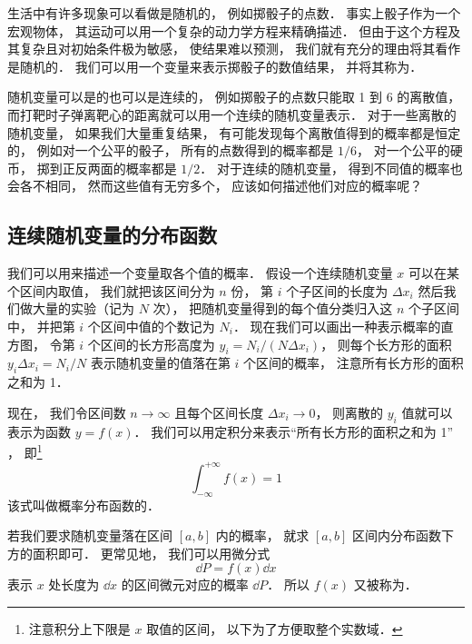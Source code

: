 

生活中有许多现象可以看做是随机的， 例如掷骰子的点数． 事实上骰子作为一个宏观物体， 其运动可以用一个复杂的动力学方程来精确描述． 但由于这个方程及其复杂且对初始条件极为敏感， 使结果难以预测， 我们就有充分的理由将其看作是随机的． 我们可以用一个变量来表示掷骰子的数值结果， 并将其称为．

随机变量可以是的也可以是连续的， 例如掷骰子的点数只能取 1 到 6 的离散值， 而打靶时子弹离靶心的距离就可以用一个连续的随机变量表示． 对于一些离散的随机变量， 如果我们大量重复结果， 有可能发现每个离散值得到的概率都是恒定的， 例如对一个公平的骰子， 所有的点数得到的概率都是 $1/6$， 对一个公平的硬币， 掷到正反两面的概率都是 $1/2$． 对于连续的随机变量， 得到不同值的概率也会各不相同， 然而这些值有无穷多个， 应该如何描述他们对应的概率呢？

\subsection{连续随机变量的分布函数}
我们可以用来描述一个变量取各个值的概率． 假设一个连续随机变量 $x$ 可以在某个区间内取值， 我们就把该区间分为 $n$ 份， 第 $i$ 个子区间的长度为 $\Delta x_i$ 然后我们做大量的实验（记为 $N$ 次）， 把随机变量得到的每个值分类归入这 $n$ 个子区间中， 并把第 $i$ 个区间中值的个数记为 $N_i$． 现在我们可以画出一种表示概率的直方图， 令第 $i$ 个区间的长方形高度为 $y_i = N_i/(N \Delta x_i)$， 则每个长方形的面积 $y_i \Delta x_i = N_i/N$ 表示随机变量的值落在第 $i$ 个区间的概率， 注意所有长方形的面积之和为 1．


现在， 我们令区间数 $n\to \infty$ 且每个区间长度 $\Delta x_i \to 0$， 则离散的 $y_i$ 值就可以表示为函数 $y = f(x)$． 我们可以用定积分来表示“所有长方形的面积之和为 1” ， 即\footnote{注意积分上下限是 $x$ 取值的区间， 以下为了方便取整个实数域．}
\begin{equation}
\int_{-\infty}^{+\infty} f(x) = 1
\end{equation}
该式叫做概率分布函数的．

若我们要求随机变量落在区间 $[a,b]$ 内的概率， 就求 $[a,b]$ 区间内分布函数下方的面积即可． 更常见地， 我们可以用微分式
\begin{equation}
\dd{P} = f(x) \dd{x}
\end{equation}
表示 $x$ 处长度为 $\dd{x}$ 的区间微元对应的概率 $\dd{P}$． 所以 $f(x)$ 又被称为．

